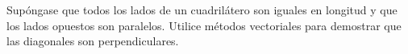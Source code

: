 \item Supóngase que todos los lados de un cuadrilátero son iguales en longitud y que los lados opuestos son paralelos. Utilice métodos vectoriales para demostrar que las diagonales son perpendiculares.
